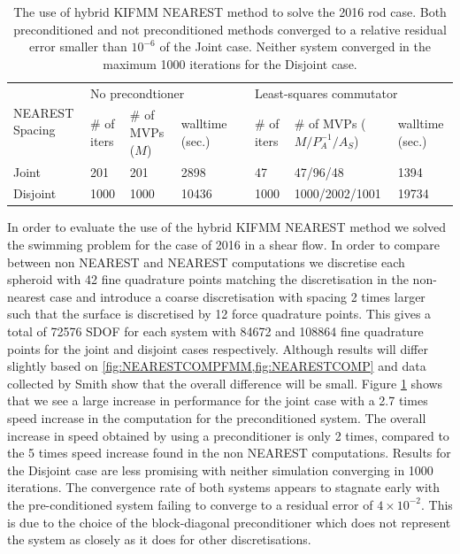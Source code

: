 \begin{table}
\begin{singlespace}
\centering
\setlength{\tabcolsep}{6pt}
\renewcommand{\arraystretch}{1.4}
\caption[The use of hybrid KIFMM NEAREST method to solve the 2016 rod case.]{The use of hybrid KIFMM NEAREST method to solve the 2016 rod case. Both preconditioned and not preconditioned methods converged to a relative residual error smaller than $10^{-6}$ of the Joint case. Neither system converged in the maximum 1000 iterations for the Disjoint case.}
\small
\begin{tabular}{p{2cm} p{0.75cm} p{2cm} p{1.0cm} p{0.1cm} p{0.75cm} p{2.5cm} p{1.5cm}}
\multirow{2}{*}{\parbox{1.8cm}{NEAREST Spacing}} & \multicolumn{3}{l}{No precondtioner} & & \multicolumn{3}{l}{Least-squares commutator} \\ \cline{2-4} \cline{6-8}
  & \# of iters & \# of MVPs ($M$) & walltime (sec.) & & \# of iters & \# of MVPs ($M/P_A^{-1}/A_S$) & walltime (sec.) \\ \hline
  Joint & 201 & 201 & 2898 & &  47 & 47/96/48 & 1394\\
  Disjoint & 1000 & 1000 & 10436 & & 1000 & 1000/2002/1001 & 19734
\end{tabular}
\label{tab:PreconditioningNear}
\end{singlespace}
\end{table}

In order to evaluate the use of the hybrid KIFMM NEAREST method we solved the swimming problem for the case of 2016 in a shear flow. In order to compare between non NEAREST and NEAREST computations we discretise each spheroid with 42 fine quadrature points matching the discretisation in the non-nearest case and introduce a coarse discretisation with spacing 2 times larger such that the surface is discretised by 12 force quadrature points.  This gives a total of 72576 SDOF for each system with 84672 and 108864 fine quadrature points for the joint and disjoint cases respectively. Although results will differ slightly based on \cref{fig:NEARESTCOMPFMM,fig:NEARESTCOMP} and data collected by Smith \cite{Smith2018AEquation} show that the overall difference will be small. Figure \ref{tab:PreconditioningNear} shows that we see a large increase in performance for the joint case with a 2.7 times speed increase in the computation for the preconditioned system. The overall increase in speed obtained by using a preconditioner is only 2 times, compared to the 5 times speed increase found in the non NEAREST computations. Results for the Disjoint case are less promising with neither simulation converging in 1000 iterations. The convergence rate of both systems appears to stagnate early with the pre-conditioned system failing to converge to a residual error of $4\times 10^{-2}$. This is due to the choice of the block-diagonal preconditioner which does not represent the system as closely as it does for other discretisations. 

